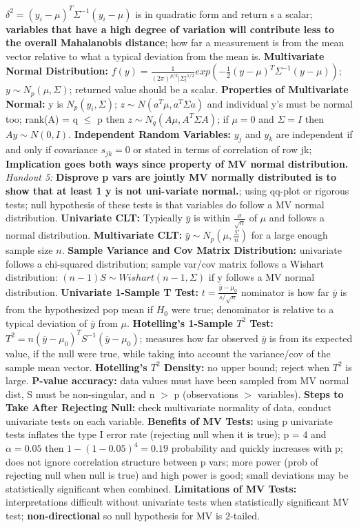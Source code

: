 \documentclass[9pt]{extarticle}
\begin{document}
$\delta^2 = (y_i - \mu)^T\Sigma^{-1}(y_i - \mu)$ is in quadratic form and 
return s a scalar; \textbf{variables that have a high degree of variation
will contribute less to the overall Mahalanobis distance}; how far a 
measurement is from the mean vector relative to what a typical deviation from 
the mean is.
\textbf{Multivariate Normal Distribution:} $f(y) = \frac{1}{(2\pi)^{p/2}|
\Sigma|^{1/2}}exp(-\frac{1}{2}(y - \mu)^T\Sigma^{-1}(y - \mu))$; 
$y \sim N_p(\mu, \Sigma)$; returned value should be a scalar.
\textbf{Properties of Multivariate Normal:} y is $N_p(y_i, \Sigma)$; 
$z \sim N(a^T\mu, a^T\Sigma a)$ and individual y's must be normal too; 
rank(A) = q $\leq$ p then $z \sim N_q(A\mu, A^T\Sigma A)$; if $\mu = 0$ and 
$\Sigma = I$ then $Ay \sim N(0, I)$.
\textbf{Independent Random Variables:} $y_j$ and $y_k$ are independent if
and only if covariance $s_{jk} = 0$ or stated in terms of correlation of row jk;
\textbf{Implication goes both ways since property of MV normal distribution.} 
\textit{Handout 5:}
\textbf{Disprove p vars are jointly MV normally distributed is to show that 
at least 1 y is not uni-variate normal.}; using qq-plot or rigorous tests; null
hypothesis of these tests is that variables do follow a MV normal distribution.
\textbf{Univariate CLT:} Typically $\bar{y}$ is within $\frac{\sigma}{\sqrt{n}}$ 
of $\mu$ and follows a normal distribution.
\textbf{Multivariate CLT:} $\bar{y} \sim N_p(\mu, \frac{\Sigma}{n})$ for a large 
enough sample size $n$.
\textbf{Sample Variance and Cov Matrix Distribution:} univariate follows a 
chi-squared distribution; sample var/cov matrix follows a Wishart distribution:
$(n-1)S \sim Wishart(n-1, \Sigma)$ if y follows a MV normal distribution.
\textbf{Univariate 1-Sample T Test:} $t = \frac{\bar{y} - \mu_0}{s/\sqrt{n}}$ 
nominator is how far $\bar{y}$ is from the hypothesized pop mean if $H_0$ were 
true; denominator is relative to a typical deviation of $\bar{y}$ from $\mu$.
\textbf{Hotelling's 1-Sample $T^2$ Test:} $T^2 = n(\bar{y} - \mu_0)^TS^{-1}
(\bar{y} - \mu_0)$; measures how far observed $\bar{y}$ is from its expected
value, if the null were true, while taking into account the variance/cov of the 
sample mean vector.
\textbf{Hotelling's $T^2$ Density:} no upper bound; reject when $T^2$ is large.
\textbf{P-value accuracy:} data values must have been sampled from MV normal 
dist, S must be non-singular, and n $>$ p (observations $>$ variables).
\textbf{Steps to Take After Rejecting Null:} check multivariate normality of 
data, conduct univariate tests on each variable.
\textbf{Benefits of MV Tests:} using p univariate tests inflates the type I
error rate (rejecting null when it is true); p = 4 and $\alpha = 0.05$ then
$1 - (1 - 0.05)^4 = 0.19$ probability and quickly increases with p; does not
ignore correlation structure between p vars; more power (prob of rejecting 
null when null is true) and high power is good; small deviations may be
statistically significant when combined.
\textbf{Limitations of MV Tests:} interpretations difficult without univariate
tests when statistically significant MV test; \textbf{non-directional} so
null hypothesis for MV is 2-tailed.\\
\end{document}
